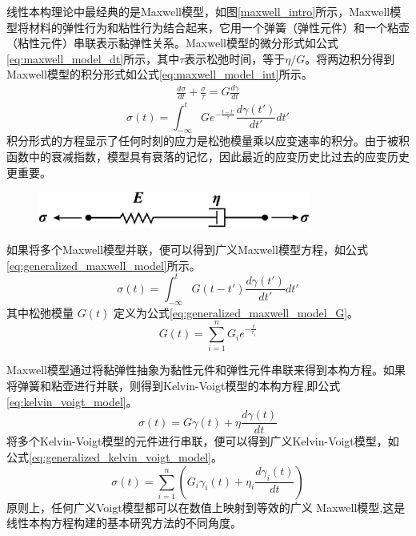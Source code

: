 线性本构理论中最经典的是Maxwell模型\cite{maxwell1867iv}，如图\ref{maxwell_intro}所示，Maxwell模型将材料的弹性行为和粘性行为结合起来，它用一个弹簧（弹性元件）和一个粘壶（粘性元件）串联表示黏弹性关系。Maxwell模型的微分形式如公式\eqref{eq:maxwell_model_dt}所示，其中$\tau$表示松弛时间，等于$\eta/G$。将两边积分得到Maxwell模型的积分形式如公式\eqref{eq:maxwell_model_int}所示。
\begin{gather}
  \frac{d\sigma}{dt} + \frac{\sigma}{\tau}  = G \frac{d\gamma}{dt} \label{eq:maxwell_model_dt}
\end{gather}
\begin{equation}
  \sigma(t)                                = \int_{-\infty}^{t} G e^{-\frac{t-t'}{\tau}} \frac{d\gamma(t')}{dt'} dt'\label{eq:maxwell_model_int}
\end{equation}
积分形式的方程显示了任何时刻的应力是松弛模量乘以应变速率的积分。由于被积函数中的衰减指数，模型具有衰落的记忆，因此最近的应变历史比过去的应变历史更重要。
\begin{figure}[htbp]
  \centering
  \includegraphics[width=0.8\textwidth]{Fig/maxwell_intro.png}
\end{figure}
如果将多个Maxwell模型并联，便可以得到广义Maxwell模型方程，如公式\eqref{eq:generalized_maxwell_model}所示。
\begin{equation}
  \sigma(t) = \int_{-\infty}^{t} G(t-t') \frac{d\gamma(t')}{dt'} dt' \label{eq:generalized_maxwell_model}
\end{equation}
其中松弛模量 \(G(t)\) 定义为公式\eqref{eq:generalized_maxwell_model_G}。
\begin{equation}
  G(t) = \sum_{i=1}^{n} G_i e^{-\frac{t}{\tau_i}} \label{eq:generalized_maxwell_model_G}
\end{equation}

Maxwell模型通过将黏弹性抽象为黏性元件和弹性元件串联来得到本构方程。如果将弹簧和粘壶进行并联，则得到Kelvin-Voigt模型的本构方程,即公式\eqref{eq:kelvin_voigt_model}\cite{voigt1892ueber}。
\begin{equation}
  \sigma(t) = G \gamma(t) + \eta \frac{d\gamma(t)}{dt} \label{eq:kelvin_voigt_model}
\end{equation}
将多个Kelvin-Voigt模型的元件进行串联，便可以得到广义Kelvin-Voigt模型，如公式\eqref{eq:generalized_kelvin_voigt_model}。
\begin{equation}
  \sigma(t) = \sum_{i=1}^{n} \left( G_i \gamma_i(t) + \eta_i \frac{d\gamma_i(t)}{dt} \right)\label{eq:generalized_kelvin_voigt_model}
\end{equation}
原则上，任何广义Voigt模型都可以在数值上映射到等效的广义 Maxwell模型,这是线性本构方程构建的基本研究方法的不同角度\cite{ricarteTutorialReviewLinear2024}。

